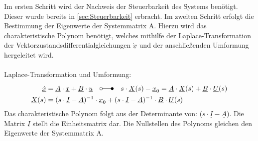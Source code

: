 Im ersten Schritt wird der Nachweis der Steuerbarkeit des Systems benötigt. Dieser wurde bereits in \autoref{sec:Steuerbarkeit} erbracht.
Im zweiten Schritt erfolgt die Bestimmung der Eigenwerte der Systemmatrix A. Hierzu wird das charakteristische Polynom benötigt, welches mithilfe der Laplace-Transformation der Vektorzustandsdifferentialgleichungen $\underline{\dot{x}}$ und der anschließenden Umformung hergeleitet wird.\\\\
Laplace-Transformation und Umformung:
\begin{align*}
    \underline{\dot{x}} &= \underline{A}\cdot\underline{x}+\underline{B}\cdot\underline{u}\quad\laplace \quad s\cdot \underline{X}(s)-\underline{x}_{\mathrm{0}}=\underline{A}\cdot \underline{X}(s)+\underline{B}\cdot \underline{U}(s) \\
    \underline{X}(s) &= (s\cdot \underline{I} - \underline{A})^{-1}\cdot\underline{x}_{\mathrm{0}}+(s\cdot \underline{I} - \underline{A})^{-1}\cdot\underline{B}\cdot\underline{U}(s)
\end{align*}
\newline
Das charakteristische Polynom folgt aus der Determinante von: ($s\cdot\underline{I}-\underline{A}$). Die Matrix $\underline{I}$ stellt die Einheitsmatrix dar. Die Nullstellen des Polynoms gleichen den Eigenwerte der Systemmatrix A.

\clearpage

